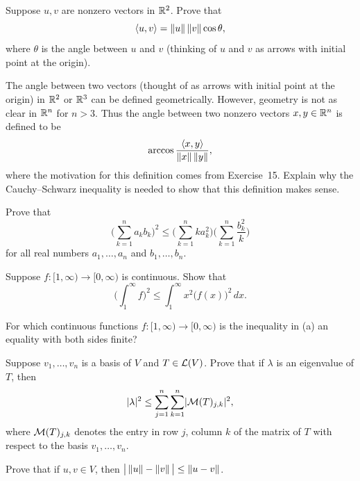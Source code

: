 \begin{exc}
\begin{exercise}
Suppose $u,v$ are nonzero vectors in $\mathbb{R}^2$. Prove that
\[ \langle u, v \rangle = \lVert u \rVert\,\lVert v \rVert\cos\theta, \]
where $\theta$ is the angle between $u$ and $v$ (thinking of $u$ and $v$ as
arrows with initial point at the origin).
\end{exercise}

\begin{exercise}
The angle between two vectors (thought of as arrows with initial point at the
origin) in $\mathbb{R}^2$ or $\mathbb{R}^3$ can be defined geometrically. However, geometry is
not as clear in $\mathbb{R}^n$ for $n>3$. Thus the angle between two nonzero vectors
$x,y\in\mathbb{R}^n$ is defined to be
\[ \arccos\frac{\langle x, y \rangle}{\lVert x \rVert\,\lVert y \rVert}, \]
where the motivation for this definition comes from Exercise~15. Explain why the
Cauchy--Schwarz inequality is needed to show that this definition makes sense.
\end{exercise}

\begin{exercise}
Prove that
\[ \biggl(\sum_{k=1}^n a_kb_k\biggr)^2
   \le \biggl(\sum_{k=1}^n ka_k^2\biggr)\biggl(\sum_{k=1}^n\frac{b_k^2}{k}\biggr) \]
for all real numbers $a_1,\dots,a_n$ and $b_1,\dots,b_n$.
\end{exercise}

\begin{exercise}\leavevmode
\begin{parts}
\item Suppose $f\colon[1,\infty)\to[0,\infty)$ is continuous. Show that
  \[ \biggl(\int_1^\infty f\biggr)^2 \le \int_1^\infty x^2\bigl(f(x)\bigr)^2\,dx. \]
\item For which continuous functions $f\colon[1,\infty)\to[0,\infty)$ is the
  inequality in (a) an equality with both sides finite?
\end{parts}
\end{exercise}

\begin{exercise}
Suppose $v_1,\dots,v_n$ is a basis of $V$ and $T\in\mathcal{L}(V)$. Prove that if
$\lambda$ is an eigenvalue of $T$, then
\[ \lvert \lambda \rvert^2 \le \sum_{j=1}^n\sum_{k=1}^n\lvert \mathcal{M}(T)_{j,k} \rvert^2, \]
where $\mathcal{M}(T)_{j,k}$ denotes the entry in row $j$, column $k$ of the matrix of
$T$ with respect to the basis $v_1,\dots,v_n$.
\end{exercise}

\begin{exercise}
Prove that if $u,v\in V$, then
$\bigl\lvert\,\lVert u \rVert-\lVert v \rVert\,\bigr\rvert\le\lVert u-v \rVert$.
\end{exercise}


\end{exc}
